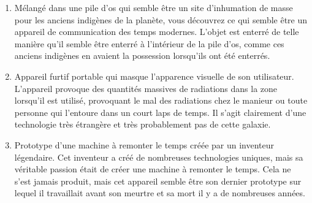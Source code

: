 \documentclass{article}
\begin{document}
\begin{enumerate}
	\item Mélangé dans une pile d'os qui semble être un site d'inhumation de masse pour les anciens indigènes de la planète, vous découvrez ce qui semble être un appareil de communication des temps modernes. L'objet est enterré de telle manière qu'il semble être enterré à l'intérieur de la pile d'os, comme ces anciens indigènes en avaient la possession lorsqu'ils ont été enterrés.
	\item Appareil furtif portable qui masque l'apparence visuelle de son utilisateur. L'appareil provoque des quantités massives de radiations dans la zone lorsqu'il est utilisé, provoquant le mal des radiations chez le manieur ou toute personne qui l'entoure dans un court laps de temps. Il s'agit clairement d'une technologie très étrangère et très probablement pas de cette galaxie.
	\item Prototype d’une machine à remonter le temps créée par un inventeur légendaire. Cet inventeur a créé de nombreuses technologies uniques, mais sa véritable passion était de créer une machine à remonter le temps. Cela ne s'est jamais produit, mais cet appareil semble être son dernier prototype sur lequel il travaillait avant son meurtre et sa mort il y a de nombreuses années.
\end{enumerate}
\end{document}
